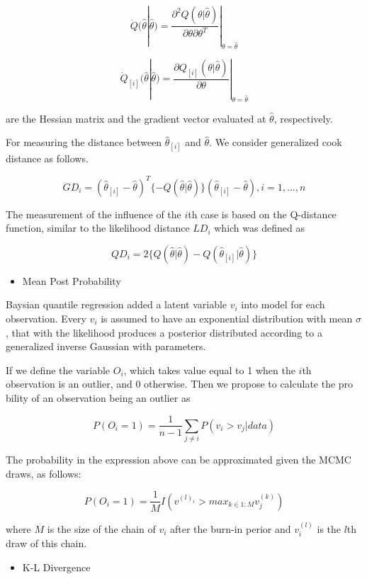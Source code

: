\documentclass[11pt,a4paper,]{article}
\providecommand{\tightlist}{%
  \setlength{\itemsep}{0pt}\setlength{\parskip}{0pt}}
\theoremstyle{definition}
\theoremstyle{definition}
\theoremstyle{remark}
\begin{document}
\[\ddot{Q}(\hat{\theta}|\hat{\theta})=\frac{\partial^{2}Q(\theta|\hat{\theta})}{\partial\theta\partial \theta^{T}}|_{\theta=\hat{\theta}}\]

\[\dot{Q}_{[i]}(\hat{\theta}|\hat{\theta})=\frac{\partial Q_{[i]}(\theta|\hat{\theta})}{\partial\theta}|_{\theta=\hat{\theta}}\]

are the Hessian matrix and the gradient vector evaluated at
\(\hat{\theta}\), respectively.

For measuring the distance between \(\hat{\theta}_{[i]}\) and
\(\hat{\theta}\). We consider generalized cook distance as follows.

\[GD_{i} =(\hat{\theta}_{[i]}-\hat{\theta})^{T}\{-Q(\hat{\theta}|\hat{\theta})\}(\hat{\theta}_{[i]}-\hat{\theta}), i=1,...,n\]

The measurement of the influence of the \(i\)th case is based on the
Q-distance function, similar to the likelihood distance \(LD_{i}\) which
was defined as

\[QD_{i}=2\{Q(\hat{\theta}|\hat{\theta})-Q(\hat{\theta}_{[i]}|\hat{\theta})\}\]

\begin{itemize}
\tightlist
\item
  Mean Post Probability
\end{itemize}

Baysian quantile regression added a latent variable \(v_i\) into model
for each observation. Every \(v_i\) is assumed to have an exponential
distribution with mean \(\sigma\), that with the likelihood produces a
posterior distributed according to a generalized inverse Gaussian with
parameters.

If we define the variable \(O_i\), which takes value equal to 1 when the
\(i\)th observation is an outlier, and 0 otherwise. Then we propose to
calculate the pro bility of an observation being an outlier as

\[P(O_i=1)=\frac{1}{n-1}\sum_{j \neq i}P(v_i > v_j|data)\]

The probability in the expression above can be approximated given the
MCMC draws, as follows:

\[P(O_i = 1)=\frac{1}{M}I(v^{(l)_i}>max_{k \in 1:M}v^{(k)}_j)\]

where \(M\) is the size of the chain of \(v_i\) after the burn-in perior
and \(v^{(l)}_i\) is the \(l\)th draw of this chain.

\begin{itemize}
\tightlist
\item
  K-L Divergence
\end{itemize}
\end{document}
